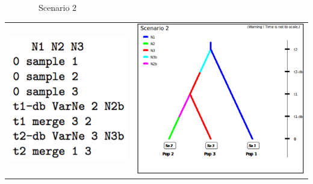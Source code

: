  \ \ \ \ \ \ \ \  Scenario 2
\begin{center} 
\begin{tabular}{cc}
\includegraphics[scale=0.5]{code_scenario_05-2.pdf} & \includegraphics[scale=0.4]{test3pop_scenario_2.pdf} \\
\end{tabular}
\end{center}

